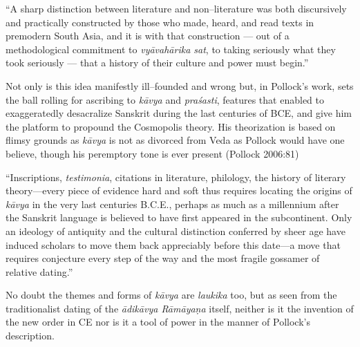 \begin{myquote}
“A sharp distinction between literature and non–literature was both discursively and practically constructed by those who made, heard, and read texts in premodern South Asia, and it is with that construction — out of a methodological commitment to \textit{vyāvahārika sat}, to taking seriously what they took seriously — that a history of their culture and power must begin.”
\end{myquote}

Not only is this idea manifestly ill–founded and wrong but, in Pollock’s work, sets the ball rolling for ascribing to \textit{kāvya} and \textit{praśasti}, features that enabled to exaggeratedly desacralize Sanskrit during the last centuries of BCE, and give him the platform to propound the Cosmopolis theory. His theorization is based on flimsy grounds as \textit{kāvya} is not as divorced from Veda as Pollock would have one believe, though his peremptory tone is ever present (Pollock 2006:81)

\begin{myquote}
“Inscriptions, \textit{testimonia}, citations in literature, philology, the history of literary theory—every piece of evidence hard and soft thus requires locating the origins of \textit{kāvya} in the very last centuries B.C.E., perhaps as much as a millennium after the Sanskrit language is believed to have first appeared in the subcontinent. Only an ideology of antiquity and the cultural distinction conferred by sheer age have induced scholars to move them back appreciably before this date—a move that requires conjecture every step of the way and the most fragile gossamer of relative dating.”
\end{myquote}

No doubt the themes and forms of \textit{kāvya} are \textit{laukika} too, but as seen from the traditionalist dating of the \textit{ādikāvya Rāmāyaṇa} itself, neither is it the invention of the new order in CE nor is it a tool of power in the manner of Pollock’s description.

